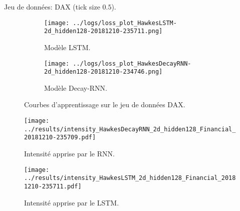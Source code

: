 \documentclass[../main.tex]{subfiles}
\begin{document}
\begin{frame}
Jeu de données: DAX (tick size $\num{0.5}$).
\end{frame}

\begin{frame}
\begin{figure}
	\begin{subfigure}{0.6\linewidth}
		\texttt{[image: ../logs/loss\_plot\_HawkesLSTM-2d\_hidden128-20181210-235711.png]}
		\caption{Modèle LSTM.}
	\end{subfigure}
	\begin{subfigure}{0.6\linewidth}
		\texttt{[image: ../logs/loss\_plot\_HawkesDecayRNN-2d\_hidden128-20181210-234746.png]}
		\caption{Modèle Decay-RNN.}
	\end{subfigure}
	\caption{Courbes d'apprentissage sur le jeu de données DAX.}
\end{figure}
\end{frame}

\begin{frame}
\begin{figure}
	\texttt{[image: ../results/intensity\_HawkesDecayRNN\_2d\_hidden128\_Financial\_20181210-235709.pdf]}
	\caption{Intensité apprise par le RNN.}
\end{figure}
\end{frame}

\begin{frame}
\begin{figure}
	\texttt{[image: ../results/intensity\_HawkesLSTM\_2d\_hidden128\_Financial\_20181210-235711.pdf]}
	\caption{Intensité apprise par le LSTM.}
\end{figure}
\end{frame}
\end{document}
